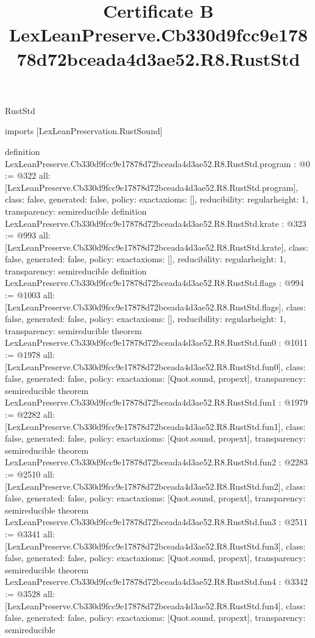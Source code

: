 \begin{lexlean}{RustStd}
\title{Certificate B LexLeanPreserve.Cb330d9fcc9e17878d72bceada4d3ae52.R8.RustStd}
\begin{coremodule}
imports [LexLeanPreservation.RustSound]

definition LexLeanPreserve.Cb330d9fcc9e17878d72bceada4d3ae52.R8.RustStd.program : @0 := @322 {
  all: [LexLeanPreserve.Cb330d9fcc9e17878d72bceada4d3ae52.R8.RustStd.program],
  class: false,
  generated: false,
  policy: exact{axioms: []},
  reducibility: regular{height: 1},
  transparency: semireducible
}
definition LexLeanPreserve.Cb330d9fcc9e17878d72bceada4d3ae52.R8.RustStd.krate : @323 := @993 {
  all: [LexLeanPreserve.Cb330d9fcc9e17878d72bceada4d3ae52.R8.RustStd.krate],
  class: false,
  generated: false,
  policy: exact{axioms: []},
  reducibility: regular{height: 1},
  transparency: semireducible
}
definition LexLeanPreserve.Cb330d9fcc9e17878d72bceada4d3ae52.R8.RustStd.flags : @994 := @1003 {
  all: [LexLeanPreserve.Cb330d9fcc9e17878d72bceada4d3ae52.R8.RustStd.flags],
  class: false,
  generated: false,
  policy: exact{axioms: []},
  reducibility: regular{height: 1},
  transparency: semireducible
}
theorem LexLeanPreserve.Cb330d9fcc9e17878d72bceada4d3ae52.R8.RustStd.fun0 : @1011 := @1978 {
  all: [LexLeanPreserve.Cb330d9fcc9e17878d72bceada4d3ae52.R8.RustStd.fun0],
  class: false,
  generated: false,
  policy: exact{axioms: [Quot.sound, propext]},
  transparency: semireducible
}
theorem LexLeanPreserve.Cb330d9fcc9e17878d72bceada4d3ae52.R8.RustStd.fun1 : @1979 := @2282 {
  all: [LexLeanPreserve.Cb330d9fcc9e17878d72bceada4d3ae52.R8.RustStd.fun1],
  class: false,
  generated: false,
  policy: exact{axioms: [Quot.sound, propext]},
  transparency: semireducible
}
theorem LexLeanPreserve.Cb330d9fcc9e17878d72bceada4d3ae52.R8.RustStd.fun2 : @2283 := @2510 {
  all: [LexLeanPreserve.Cb330d9fcc9e17878d72bceada4d3ae52.R8.RustStd.fun2],
  class: false,
  generated: false,
  policy: exact{axioms: [Quot.sound, propext]},
  transparency: semireducible
}
theorem LexLeanPreserve.Cb330d9fcc9e17878d72bceada4d3ae52.R8.RustStd.fun3 : @2511 := @3341 {
  all: [LexLeanPreserve.Cb330d9fcc9e17878d72bceada4d3ae52.R8.RustStd.fun3],
  class: false,
  generated: false,
  policy: exact{axioms: [Quot.sound, propext]},
  transparency: semireducible
}
theorem LexLeanPreserve.Cb330d9fcc9e17878d72bceada4d3ae52.R8.RustStd.fun4 : @3342 := @3528 {
  all: [LexLeanPreserve.Cb330d9fcc9e17878d72bceada4d3ae52.R8.RustStd.fun4],
  class: false,
  generated: false,
  policy: exact{axioms: [Quot.sound, propext]},
  transparency: semireducible
}
\end{coremodule}
\end{lexlean}
